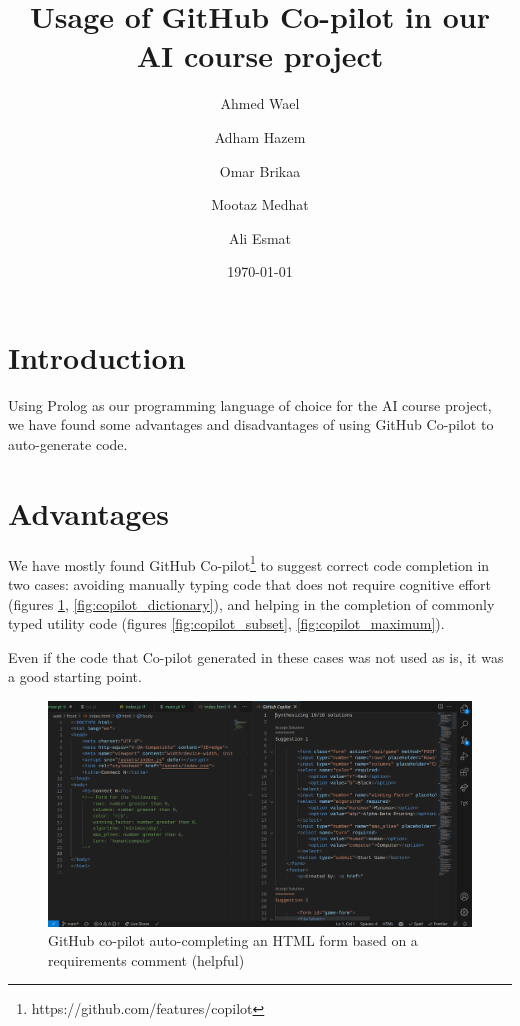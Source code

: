 \documentclass[11pt,a4paper]{article}
\begin{document}
\title{Usage of GitHub Co-pilot in our AI course project}
\author{
    Ahmed Wael \and Adham Hazem \and Omar Brikaa \and Mootaz Medhat \and Ali Esmat
}
\date{\today}
\maketitle

\section{Introduction}
Using Prolog as our programming language of choice for the AI course project,
we have found some advantages and disadvantages of using GitHub Co-pilot to auto-generate code.

\section{Advantages}
We have mostly found GitHub Co-pilot\footnote{https://github.com/features/copilot} to suggest correct code completion
in two cases:
avoiding manually typing code that does not require cognitive effort
(figures \ref{fig:copilot_html}, \ref{fig:copilot_dictionary}),
and helping in the completion of commonly typed utility code
(figures \ref{fig:copilot_subset}, \ref{fig:copilot_maximum}).

Even if the code that Co-pilot generated in these cases was not used as is, it was a good starting point.

\begin{figure}
    \includegraphics[width=\textwidth]{copilot-helpful-html}
    \caption{GitHub co-pilot auto-completing an HTML form based on a requirements comment (helpful)}
    \label{fig:copilot_html}
\end{figure}
\end{document}
